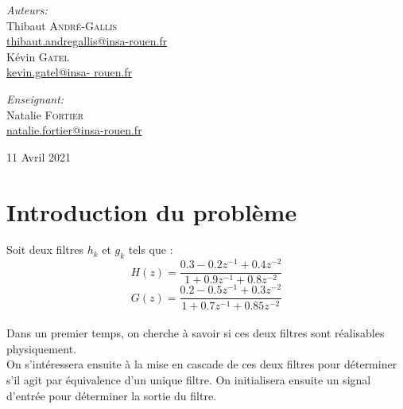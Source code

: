 \documentclass[12,french]{report}
\begin{document}
\begin{titlepage}
\begin{center}
	\begin{minipage}{0.4\textwidth}
		\begin{flushleft} \large
			\emph{Auteurs:}\\
			Thibaut \textsc{André-Gallis} \\
			{\small\href{mailto:thibaut.andregallis@insa-rouen.fr}{thibaut.andregallis@insa-rouen.fr}} \\
			Kévin \textsc{Gatel} \\
			{\small\href{mailto:kevin.gatel@insa-rouen.fr}{kevin.gatel@insa-				rouen.fr}}
		\end{flushleft}
	\end{minipage}
	\begin{minipage}{0.4\textwidth}
		\begin{flushright} \large
			\emph{Enseignant:} \\
			Natalie \textsc{Fortier} \\
			{\small\href{mailto:natalie.fortier@insa-rouen.fr}								{natalie.fortier@insa-rouen.fr}}
		\end{flushright}
	\end{minipage}

	\vfill
	{\large 11 Avril 2021}
\end{center}
\end{titlepage}

\tableofcontents


\renewcommand{\chaptername}{}
\chapter*{Introduction du problème}

Soit deux filtres $h_k$ et $g_k$ tels que :\\

$$ H(z) = \frac{0.3-0.2z^{-1}+0.4z^{-2}}{1+0.9z^{-1}+0.8z^{-2}} $$
$$ G(z) = \frac{0.2-0.5z^{-1}+0.3z^{-2}}{1+0.7z^{-1}+0.85z^{-2}} $$ \\

Dans un premier temps, on cherche à savoir si ces deux filtres sont réalisables physiquement.\\

On s’intéressera ensuite à la mise en cascade de ces deux filtres pour déterminer s'il agit par équivalence d'un unique filtre. On initialisera ensuite un signal d'entrée pour déterminer la sortie du filtre.\\
\end{document}
